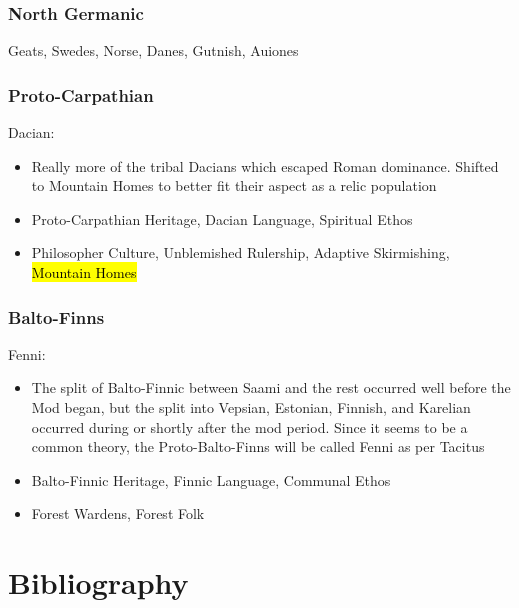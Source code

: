 \documentclass{article}
\begin{document}
	\subsubsection{North Germanic}
	Geats, Swedes, Norse, Danes, Gutnish, Auiones
	
	\subsubsection{Proto-Carpathian}
	Dacian:
	\begin{itemize}
		\item Really more of the tribal Dacians which escaped Roman dominance.
		Shifted to Mountain Homes to better fit their aspect as a relic population
		\item Proto-Carpathian Heritage, Dacian Language, Spiritual Ethos
		\item Philosopher Culture, Unblemished Rulership, Adaptive Skirmishing, \hl{Mountain Homes}
	\end{itemize}
	
	\subsubsection{Balto-Finns}
	Fenni:
	\begin{itemize}
		\item The split of Balto-Finnic between Saami and the rest occurred well before the Mod began, but the split into Vepsian, Estonian, Finnish, and Karelian occurred during or shortly after the mod period.
		Since it seems to be a common theory, the Proto-Balto-Finns will be called Fenni as per Tacitus
		\item Balto-Finnic Heritage, Finnic Language, Communal Ethos
		\item Forest Wardens, Forest Folk
	\end{itemize}
	
	\newpage
	
	\section{Bibliography}
	\label{sec:Bibliography}
	
\end{document}
